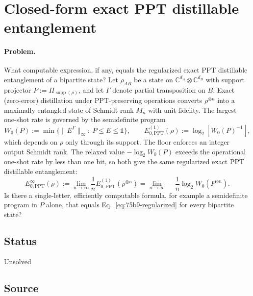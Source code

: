 \section{Closed-form exact PPT distillable entanglement}
\label{sec:op_75b91a20dd384110}

\paragraph{Problem.}
What computable expression, if any, equals the regularized exact PPT
distillable entanglement of a bipartite state?  Let $\rho_{AB}$ be a state
on $\mathbb C^{d_A}\otimes\mathbb C^{d_B}$ with support projector
$P:=\Pi_{\operatorname{supp}(\rho)}$, and let $\Gamma$ denote partial
transposition on $B$.  Exact (zero-error) distillation under
PPT-preserving operations converts $\rho^{\otimes n}$ into a maximally
entangled state of Schmidt rank $M_n$ with unit fidelity.  The largest
one-shot rate is governed by the semidefinite program
\begin{equation}
  W_0(P):=\min\bigl\{\|E^{\Gamma}\|_\infty:\ P\leq E\leq\mathbb 1\bigr\},
  \qquad
  E^{(1)}_{0,\mathrm{PPT}}(\rho):=\log_2\left\lfloor W_0(P)^{-1}\right\rfloor,
  \label{eq:75b9-one-shot}
\end{equation}
which depends on $\rho$ only through its support.  The floor enforces an
integer output Schmidt rank.  The relaxed value $-\log_2W_0(P)$ exceeds the
operational one-shot rate by less than one bit, so both give the same
regularized exact PPT distillable entanglement:
\begin{equation}
  E^{\infty}_{0,\mathrm{PPT}}(\rho)
  :=\lim_{n\to\infty}\frac1n E^{(1)}_{0,\mathrm{PPT}}(\rho^{\otimes n})
  =\lim_{n\to\infty}-\frac1n\log_2W_0(P^{\otimes n}).
  \label{eq:75b9-regularized}
\end{equation}
Is there a single-letter, efficiently computable formula, for example a
semidefinite program in $P$ alone, that equals
Eq.~\eqref{eq:75b9-regularized} for every bipartite state?

\subsection*{Status}

Unsolved

\subsection*{Source}

